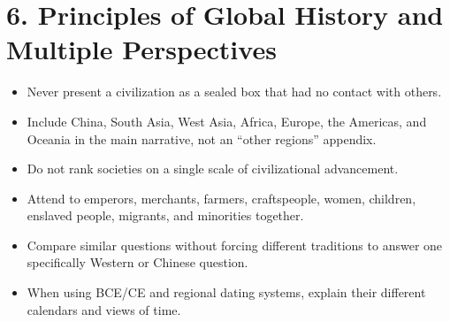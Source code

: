 \section*{6. Principles of Global History and Multiple Perspectives}
\begin{itemize}
\item Never present a civilization as a sealed box that had no contact with others.
\item Include China, South Asia, West Asia, Africa, Europe, the Americas, and Oceania in the main narrative, not an ``other regions'' appendix.
\item Do not rank societies on a single scale of civilizational advancement.
\item Attend to emperors, merchants, farmers, craftspeople, women, children, enslaved people, migrants, and minorities together.
\item Compare similar questions without forcing different traditions to answer one specifically Western or Chinese question.
\item When using BCE/CE and regional dating systems, explain their different calendars and views of time.
\end{itemize}
